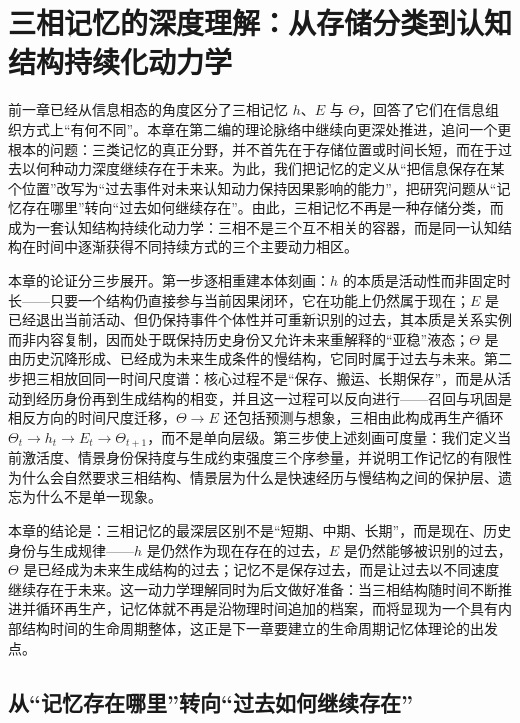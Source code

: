 \chapter{三相记忆的深度理解：从存储分类到认知结构持续化动力学}

\begin{chapterlead}
前一章已经从信息相态的角度区分了三相记忆 $h$、$E$ 与 $\Theta$，回答了它们在信息组织方式上“有何不同”。本章在第二编的理论脉络中继续向更深处推进，追问一个更根本的问题：三类记忆的真正分野，并不首先在于存储位置或时间长短，而在于过去以何种动力深度继续存在于未来。为此，我们把记忆的定义从“把信息保存在某个位置”改写为“过去事件对未来认知动力保持因果影响的能力”，把研究问题从“记忆存在哪里”转向“过去如何继续存在”。由此，三相记忆不再是一种存储分类，而成为一套认知结构持续化动力学：三相不是三个互不相关的容器，而是同一认知结构在时间中逐渐获得不同持续方式的三个主要动力相区。

本章的论证分三步展开。第一步逐相重建本体刻画：$h$ 的本质是活动性而非固定时长——只要一个结构仍直接参与当前因果闭环，它在功能上仍然属于现在；$E$ 是已经退出当前活动、但仍保持事件个体性并可重新识别的过去，其本质是关系实例而非内容复制，因而处于既保持历史身份又允许未来重解释的“亚稳”液态；$\Theta$ 是由历史沉降形成、已经成为未来生成条件的慢结构，它同时属于过去与未来。第二步把三相放回同一时间尺度谱：核心过程不是“保存、搬运、长期保存”，而是从活动到经历身份再到生成结构的相变，并且这一过程可以反向进行——召回与巩固是相反方向的时间尺度迁移，$\Theta\rightarrow E$ 还包括预测与想象，三相由此构成再生产循环 $\Theta_t\rightarrow h_t\rightarrow E_t\rightarrow\Theta_{t+1}$，而不是单向层级。第三步使上述刻画可度量：我们定义当前激活度、情景身份保持度与生成约束强度三个序参量，并说明工作记忆的有限性为什么会自然要求三相结构、情景层为什么是快速经历与慢结构之间的保护层、遗忘为什么不是单一现象。

本章的结论是：三相记忆的最深层区别不是“短期、中期、长期”，而是现在、历史身份与生成规律——$h$ 是仍然作为现在存在的过去，$E$ 是仍然能够被识别的过去，$\Theta$ 是已经成为未来生成结构的过去；记忆不是保存过去，而是让过去以不同速度继续存在于未来。这一动力学理解同时为后文做好准备：当三相结构随时间不断推进并循环再生产，记忆体就不再是沿物理时间追加的档案，而将显现为一个具有内部结构时间的生命周期整体，这正是下一章要建立的生命周期记忆体理论的出发点。
\end{chapterlead}

\section{从“记忆存在哪里”转向“过去如何继续存在”}

